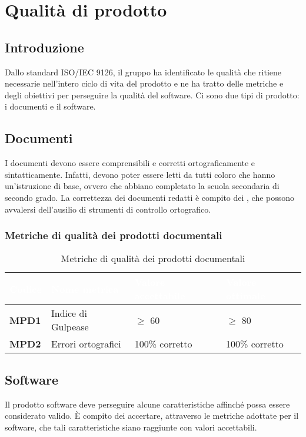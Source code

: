 \section{Qualità di prodotto}
\subsection{Introduzione}
Dallo standard ISO/IEC 9126, il gruppo \Gruppo{} ha identificato le qualità che ritiene necessarie nell'intero ciclo di vita del prodotto e ne ha tratto delle metriche e degli obiettivi per perseguire la qualità del software. Ci sono due tipi di prodotto: i documenti e il software.

\subsection{Documenti}
I documenti devono essere comprensibili e corretti ortograficamente e sintatticamente. Infatti, devono poter essere letti da tutti coloro che hanno un'istruzione di base, ovvero che abbiano completato la scuola secondaria di secondo grado. La correttezza dei documenti redatti è compito dei , che possono avvalersi dell'ausilio di strumenti di controllo ortografico. 

\subsubsection{Metriche di qualità dei prodotti documentali}
\renewcommand{\arraystretch}{1.5}
\begin{longtable}{C{2.5cm} C{5.5cm} C{3.5cm} C{3.5cm}}
\textcolor{white}{\textbf{Codice}}&
\textcolor{white}{\textbf{Nome metrica}}&
\textcolor{white}{\textbf{Valore accettabile}}&
\textcolor{white}{\textbf{Valore ottimale}}\\	
\endhead
\endfoot
{}\caption{Metriche di qualità dei prodotti documentali}
\endlastfoot
		\textbf{MPD1} & Indice di Gulpease & $\geq$ 60 & $\geq$ 80\\
		\textbf{MPD2} & Errori ortografici & 100\% corretto & 100\% corretto \\
\end{longtable}

\subsection{Software}
Il prodotto software deve perseguire alcune caratteristiche affinché possa essere considerato valido. È compito dei  accertare, attraverso le metriche adottate per il software, che tali caratteristiche siano raggiunte con valori accettabili.

